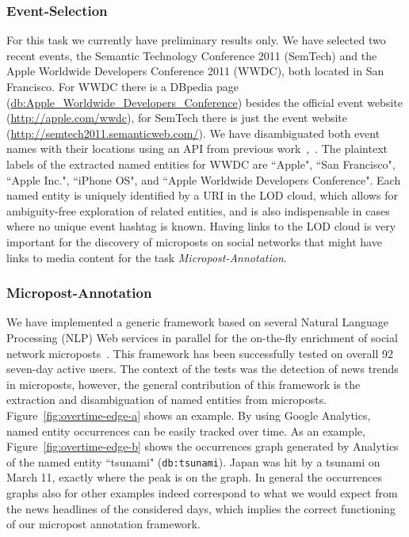 \documentclass[runningheads,a4paper]{llncs}
\begin{document}
\subsubsection{Event-Selection}
For this task we currently have preliminary results only. We have selected two recent events, the Semantic Technology Conference 2011 (SemTech) and the Apple Worldwide Developers Conference 2011 (WWDC), both located in San Francisco. For WWDC there is a DBpedia page (\url{db:Apple_Worldwide_Developers_Conference}) besides the official event website (\url{http://apple.com/wwdc}), for SemTech there is just the event website (\url{http://semtech2011.semanticweb.com/}). We have disambiguated both event names with their locations using an API from previous work~\cite{semwebvid},~\cite{twittertrends}. The plaintext labels of the extracted named entities for WWDC are ``Apple", ``San Francisco", ``Apple Inc.", ``iPhone OS", and ``Apple Worldwide Developers Conference". Each named entity is uniquely identified by a URI in the LOD cloud, which allows for ambiguity-free exploration of related entities, and is also indispensable in cases where no unique event hashtag is known. Having links to the LOD cloud is very important for the discovery of microposts on social networks that might have links to media content for the task \emph{Micropost-Annotation}.

\subsubsection{Micropost-Annotation}
We have implemented a generic framework based on several Natural Language Processing (NLP) Web services in parallel for the on-the-fly enrichment of social network microposts~\cite{twittertrends}. This framework has been successfully tested on overall 92 seven-day active users. The context of the tests was the detection of news trends in microposts, however, the general contribution of this framework is the extraction and disambiguation of named entities from microposts. Figure~\ref{fig:overtime-edge-a} shows an example. By using Google Analytics, named entity occurrences can be easily tracked over time. As an example, Figure~\ref{fig:overtime-edge-b} shows the occurrences graph generated by Analytics of the named entity ``tsunami" (\texttt{db:tsunami}). Japan was hit by a tsunami on March 11, exactly where the peak is on the graph. In general the occurrences graphs also for other examples indeed correspond to what we would expect from the news headlines of the considered days, which implies the correct functioning of our micropost annotation framework.
\end{document}
